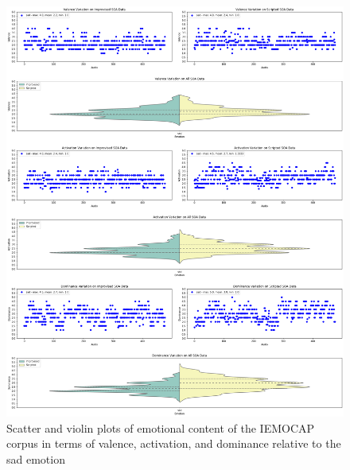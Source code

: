 \begin{figure}[H]
	\centering
	\includegraphics[width=1\linewidth]{figs/appendix/IEMOCAP_data_study/sadScatterViolins.png}
	\caption{Scatter and violin plots of emotional content of the IEMOCAP corpus in terms of valence, activation, and dominance relative to the sad emotion}
	\label{fig:sadScatterViolins}
\end{figure}


